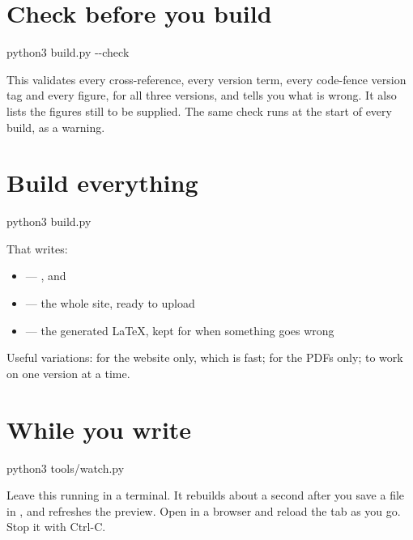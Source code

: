 \documentclass{symbulator}
\begin{document}

\section{Check before you build}

\begin{symtype}
python3 build.py -{}-check
\end{symtype}

This validates every cross-reference, every version term, every code-fence
version tag and every figure, for all three versions, and tells you what is
wrong. It also lists the figures still to be supplied. The same check runs at
the start of every build, as a warning.

\section{Build everything}

\begin{symtype}
python3 build.py
\end{symtype}

That writes:

\begin{itemize}
\item {} --- ,
       and 
\item {} --- the whole site, ready to upload
\item {} --- the generated LaTeX, kept for when something
      goes wrong
\end{itemize}

Useful variations:  for the website only, which is fast;
 for the PDFs only;  to work on one
version at a time.

\section{While you write}

\begin{symtype}
python3 tools/watch.py
\end{symtype}

Leave this running in a terminal. It rebuilds about a second after you save a
file in , and refreshes the preview. Open
 in a browser and reload the tab as you go.
Stop it with Ctrl-C.
\end{document}
